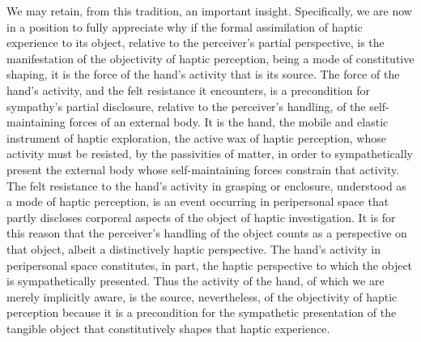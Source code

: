 We may retain, from this tradition, an important insight. Specifically, we are now in a position to fully appreciate why if the formal assimilation of haptic experience to its object, relative to the perceiver's partial perspective, is the manifestation of the objectivity of haptic perception, being a mode of constitutive shaping, it is the force of the hand's activity that is its source. The force of the hand's activity, and the felt resistance it encounters, is a precondition for sympathy's partial disclosure, relative to the perceiver's handling, of the self-maintaining forces of an external body. It is the hand, the mobile and elastic instrument of haptic exploration, the active wax of haptic perception, whose activity must be resisted, by the passivities of matter, in order to sympathetically present the external body whose self-maintaining forces constrain that activity. The felt resistance to the hand's activity in grasping or enclosure, understood as a mode of haptic perception, is an event occurring in peripersonal space that partly discloses corporeal aspects of the object of haptic investigation. It is for this reason that the perceiver's handling of the object counts as a perspective on that object, albeit a distinctively haptic perspective. The hand's activity in peripersonal space constitutes, in part, the haptic perspective to which the object is sympathetically presented. Thus the activity of the hand, of which we are merely implicitly aware, is the source, nevertheless, of the objectivity of haptic perception because it is a precondition for the sympathetic presentation of the tangible object that constitutively shapes that haptic experience.






